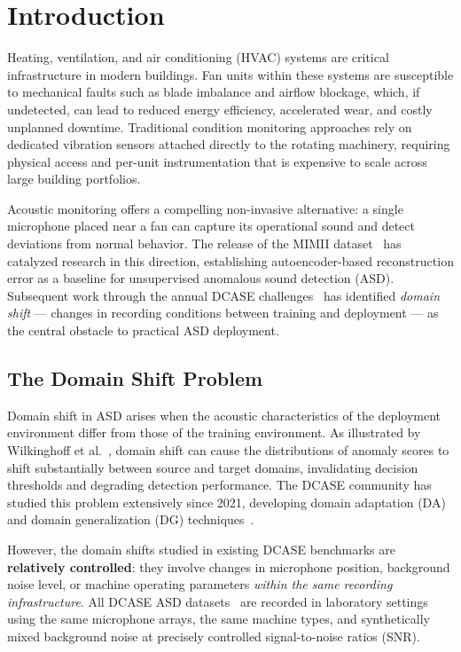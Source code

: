 \documentclass[12pt, a4paper]{article}
\begin{document}
\section{Introduction}
\label{sec:intro}

Heating, ventilation, and air conditioning (HVAC) systems are critical infrastructure in modern buildings. Fan units within these systems are susceptible to mechanical faults such as blade imbalance and airflow blockage, which, if undetected, can lead to reduced energy efficiency, accelerated wear, and costly unplanned downtime. Traditional condition monitoring approaches rely on dedicated vibration sensors attached directly to the rotating machinery, requiring physical access and per-unit instrumentation that is expensive to scale across large building portfolios.

Acoustic monitoring offers a compelling non-invasive alternative: a single microphone placed near a fan can capture its operational sound and detect deviations from normal behavior. The release of the MIMII dataset~\cite{purohit2019mimii} has catalyzed research in this direction, establishing autoencoder-based reconstruction error as a baseline for unsupervised anomalous sound detection (ASD). Subsequent work through the annual DCASE challenges~\cite{wilkinghoff2025domainshift} has identified \emph{domain shift} --- changes in recording conditions between training and deployment --- as the central obstacle to practical ASD deployment.

\subsection{The Domain Shift Problem}

Domain shift in ASD arises when the acoustic characteristics of the deployment environment differ from those of the training environment. As illustrated by Wilkinghoff et al.~\cite{wilkinghoff2025domainshift}, domain shift can cause the distributions of anomaly scores to shift substantially between source and target domains, invalidating decision thresholds and degrading detection performance. The DCASE community has studied this problem extensively since 2021, developing domain adaptation (DA) and domain generalization (DG) techniques~\cite{wilkinghoff2025domainshift}.

However, the domain shifts studied in existing DCASE benchmarks are \textbf{relatively controlled}: they involve changes in microphone position, background noise level, or machine operating parameters \emph{within the same recording infrastructure}. All DCASE ASD datasets~\cite{wilkinghoff2025domainshift} are recorded in laboratory settings using the same microphone arrays, the same machine types, and synthetically mixed background noise at precisely controlled signal-to-noise ratios (SNR).
\end{document}
